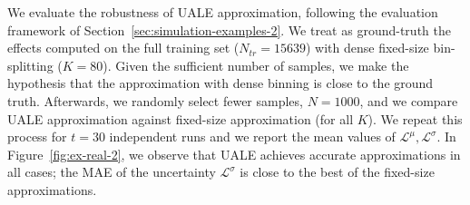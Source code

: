 \documentclass[twoside]{article}
\begin{document}
We evaluate the robustness of UALE approximation, following the
evaluation framework of Section~\ref{sec:simulation-examples-2}. We
treat as ground-truth the effects computed on the full training set
(\(N_{tr}=15639\)) with dense fixed-size bin-splitting
(\(K=80\)). Given the sufficient number of samples, we make the
hypothesis that the approximation with dense binning is close to the
ground truth. Afterwards, we randomly select fewer samples,
\(N=1000\), and we compare UALE approximation against fixed-size
approximation (for all \(K\)). We repeat this process for \(t=30\)
independent runs and we report the mean values of
\(\mathcal{L}^{\mu}, \mathcal{L}^{\sigma}\). In
Figure~\ref{fig:ex-real-2}, we observe that UALE achieves accurate
approximations in all cases; the MAE of the uncertainty
\(\mathcal{L}^\sigma\) is close to the best of the fixed-size
approximations.
\end{document}
